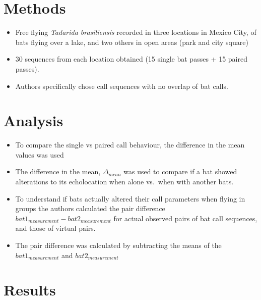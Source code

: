 \documentclass[
]{book}
\providecommand{\tightlist}{%
  \setlength{\itemsep}{0pt}\setlength{\parskip}{0pt}}
\begin{document}
\hypertarget{methods-2}{%
\section{Methods}\label{methods-2}}

\begin{itemize}
\tightlist
\item
  Free flying \emph{Tadarida brasiliensis} recorded in three locations in Mexico City, of bats flying over a lake, and two others in open areas (park and city square)
\item
  30 sequences from each location obtained (15 single bat passes + 15 paired passes).
\item
  Authors specifically chose call sequences with no overlap of bat calls.
\end{itemize}

\hypertarget{analysis}{%
\section{Analysis}\label{analysis}}

\begin{itemize}
\tightlist
\item
  To compare the single vs paired call behaviour, the difference in the mean values was used
\item
  The difference in the mean, \(\Delta_{mean}\) was used to compare if a bat showed alterations to its echolocation when alone vs.~when with another bats.
\item
  To understand if bats actually altered their call parameters when flying in groups the authors calculated the pair difference \(bat1_{measurement}-bat2_{measurement}\) for actual observed pairs of bat call sequences, and those of virtual pairs.
\item
  The pair difference was calculated by subtracting the means of the \(bat1_{measurement}\) and \(bat2_{measurement}\)
\end{itemize}

\hypertarget{results-2}{%
\section{Results}\label{results-2}}
\end{document}
